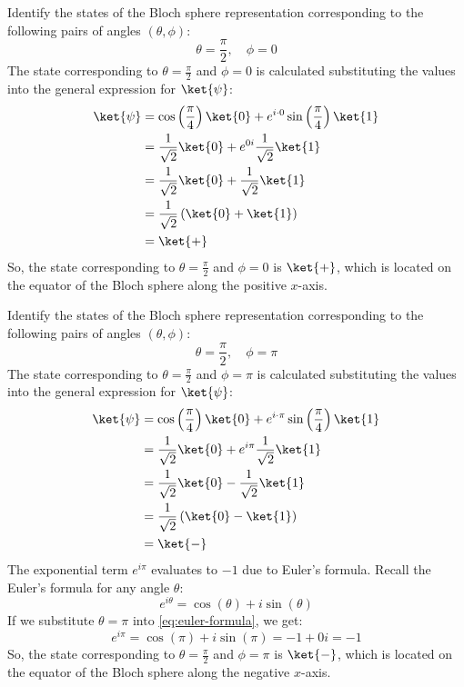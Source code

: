 \highspace
\exercise Identify the states of the Bloch sphere representation corresponding to the following pairs of angles $(\theta, \phi)$:
\begin{equation*}
    \theta = \frac{\pi}{2}, \quad \phi = 0
\end{equation*}
\solution The state corresponding to $\theta = \frac{\pi}{2}$ and $\phi = 0$ is calculated substituting the values into the general expression for $\ket{\psi}$:
\begin{equation*}
    \begin{aligned}
        \ket{\psi} &= \cos\left(\frac{\pi}{4}\right)\ket{0} + e^{i \cdot 0}\sin\left(\frac{\pi}{4}\right)\ket{1} \\
        &= \frac{1}{\sqrt{2}}\ket{0} + e^{0i}\frac{1}{\sqrt{2}}\ket{1} \\
        &= \frac{1}{\sqrt{2}}\ket{0} + \frac{1}{\sqrt{2}}\ket{1} \\
        &= \frac{1}{\sqrt{2}}\left(\ket{0} + \ket{1}\right) \\
        &= \ket{+}
    \end{aligned}
\end{equation*}
So, the state corresponding to $\theta = \frac{\pi}{2}$ and $\phi = 0$ is $\ket{+}$, which is located on the equator of the Bloch sphere along the positive $x$-axis.

\highspace
\exercise Identify the states of the Bloch sphere representation corresponding to the following pairs of angles $(\theta, \phi)$:
\begin{equation*}
    \theta = \frac{\pi}{2}, \quad \phi = \pi
\end{equation*}
\solution The state corresponding to $\theta = \frac{\pi}{2}$ and $\phi = \pi$ is calculated substituting the values into the general expression for $\ket{\psi}$:
\begin{equation*}
    \begin{aligned}
        \ket{\psi} &= \cos\left(\frac{\pi}{4}\right)\ket{0} + e^{i \cdot \pi}\sin\left(\frac{\pi}{4}\right)\ket{1} \\
        &= \frac{1}{\sqrt{2}}\ket{0} + e^{i\pi}\frac{1}{\sqrt{2}}\ket{1} \\
        &= \frac{1}{\sqrt{2}}\ket{0} - \frac{1}{\sqrt{2}}\ket{1} \\
        &= \frac{1}{\sqrt{2}}\left(\ket{0} - \ket{1}\right) \\
        &= \ket{-}
    \end{aligned}
\end{equation*}
The exponential term $e^{i\pi}$ evaluates to $-1$ due to Euler's formula. Recall the Euler's formula for any angle $\theta$:
\begin{equation}\label{eq:euler-formula}
    e^{i\theta} = \cos(\theta) + i\sin(\theta)
\end{equation}
If we substitute $\theta = \pi$ into \autoref{eq:euler-formula}, we get:
\begin{equation*}
    e^{i\pi} = \cos(\pi) + i\sin(\pi) = -1 + 0i = -1
\end{equation*}
So, the state corresponding to $\theta = \frac{\pi}{2}$ and $\phi = \pi$ is $\ket{-}$, which is located on the equator of the Bloch sphere along the negative $x$-axis.